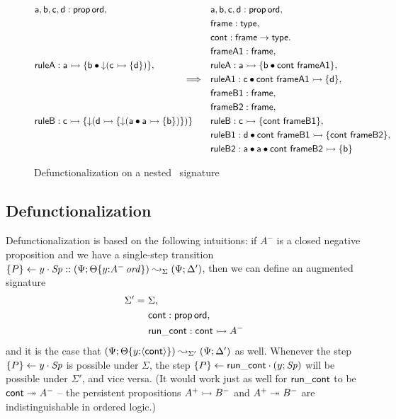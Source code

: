 \begin{figure}[ht]
\begin{align*}
& {\sf a}, {\sf b}, {\sf c}, {\sf d} : {\sf prop}\,{\sf ord},
& & {\sf a}, {\sf b}, {\sf c}, {\sf d} : {\sf prop}\,{\sf ord},\\
& & & {\sf frame} : {\sf type}, \\
& & & {\sf cont} : {\sf frame} \rightarrow {\sf type}.\\
& & & {\sf frameA1} : {\sf frame},\\
& {\sf ruleA} : {\sf a} \rightarrowtail \{ {\sf b} \mathbin{\bullet} {\downarrow}({\sf c} \rightarrowtail \{ {\sf d} \}) \},
& & {\sf ruleA} : {\sf a} \rightarrowtail \{ {\sf b} \mathbin{\bullet} {\sf cont}~{\sf frameA1} \},
\\
& \qquad\qquad\qquad\qquad\qquad\qquad\qquad\qquad  \Longrightarrow & & {\sf ruleA1} : {\sf c} \mathbin{\bullet} {\sf cont}~{\sf frameA1} \rightarrowtail \{ {\sf d} \},\\
& & & {\sf frameB1} : {\sf frame},\\
& & & {\sf frameB2} : {\sf frame},\\
& {\sf ruleB} : {\sf c} \rightarrowtail \{ {\downarrow}({\sf d} 
       \rightarrowtail \{ {\downarrow}({\sf a} \mathbin{\bullet} {\sf a} \rightarrowtail \{ {\sf b} \}) \}) \}
& & {\sf ruleB} : {\sf c} \rightarrowtail \{ {\sf cont}~{\sf frameB1} \},
\\
& & & {\sf ruleB1} : {\sf d} \mathbin{\bullet} {\sf cont}~{\sf frameB1} 
        \rightarrowtail \{ {\sf cont}~{\sf frameB2} \},
\\
& & & {\sf ruleB2} : {\sf a} \mathbin{\bullet} {\sf a} \mathbin{\bullet} {\sf cont}~{\sf frameB2} \rightarrowtail \{ {\sf b} \}
\end{align*}
\caption{Defunctionalization on a nested \sls~signature}
\label{fig:defuncexample}
\end{figure}




\subsection{Defunctionalization}
\label{sec:defunc-defunc}

Defunctionalization is based on the following intuitions:
if $A^-$ is a closed negative proposition
and we have a single-step transition 
$\{{P}\} \leftarrow {y} \cdot {{\it Sp}} :: (\Psi; {\Theta}\{{y{:}{A^-}\,{{\it ord}}}\}) 
 \leadsto_{\Sigma} 
 (\Psi; \Delta')$,
then we can define an augmented signature
\begin{align*}
\Sigma' = ~ & \Sigma, 
\\    ~~ & {\sf cont} : {\sf prop\,ord}, 
\\    ~~ & {\sf run\_cont} : {\sf cont} \rightarrowtail A^-
\end{align*}
and it is the case that 
$(\Psi; {\Theta}\{{y{:}\langle {\sf cont} \rangle}\}) 
 \leadsto_{\Sigma'} 
 (\Psi; \Delta')$
as well. Whenever the step $\{{P}\} \leftarrow {y} \cdot {{\it Sp}}$ is possible under $\Sigma$,
the step $\{{P}\} \leftarrow {\sf run\_cont} \cdot {(y; {\it Sp})}$ will be possible under $\Sigma'$,
and vice versa.  (It would work just as well for ${\sf run\_cont}$ to be ${\sf
  cont} \twoheadrightarrow A^-$ -- the persistent propositions $A^+ \rightarrowtail
B^-$ and $A^+
\twoheadrightarrow B^-$ are indistinguishable in ordered logic.)

